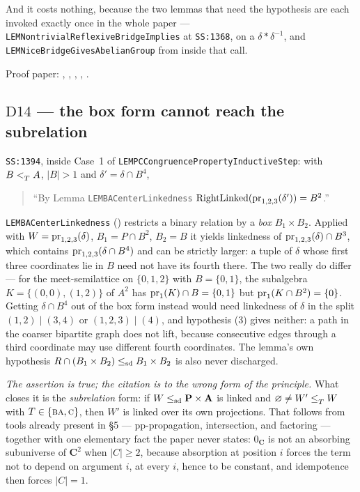 And it costs nothing, because the two lemmas that need the hypothesis are each
invoked exactly once in the whole paper --- \texttt{LEMNontrivialReflexive\-Bridge\-Implies}
at \texttt{SS:1368}, on a $\delta\ast\delta^{-1}$, and
\texttt{LEMNiceBridgeGivesAbelianGroup} from inside that call.

Proof paper: , ,
, ,
.

\subsection{$\mathrm D{14}$ --- the box form cannot reach the subrelation}
\label{sec:D14}

\texttt{SS:1394}, inside Case~1 of
\texttt{LEMPCCongruencePropertyInductiveStep}: with $B<_{T}^{}A$, $|B|>1$ and
$\delta'=\delta\cap B^{4}$,

\begin{quote}\small
``By Lemma \texttt{LEMBACenterLinkedness}
$\operatorname{RightLinked}(\operatorname*{pr}_{1,2,3}(\delta'))=B^{2}$.''
\end{quote}

\texttt{LEMBACenterLinkedness} (\cite[Prop.~2.15(i)]{BartoKozik}) restricts a
binary relation by a \emph{box} $B_{1}\times B_{2}$. Applied with
$W=\operatorname*{pr}_{1,2,3}(\delta)$, $B_{1}=P\cap B^{2}$, $B_{2}=B$ it yields linkedness
of $\operatorname*{pr}_{1,2,3}(\delta)\cap B^{3}$, which contains
$\operatorname*{pr}_{1,2,3}(\delta\cap B^{4})$ and can be strictly larger: a tuple of
$\delta$ whose first three coordinates lie in $B$ need not have its fourth
there. The two really do differ --- for the meet-semilattice on $\{0,1,2\}$
with $B=\{0,1\}$, the subalgebra $K=\{(0,0),(1,2)\}$ of $A^{2}$ has
$\operatorname*{pr}_{1}(K)\cap B=\{0,1\}$ but $\operatorname*{pr}_{1}(K\cap B^{2})=\{0\}$. Getting
$\delta\cap B^{4}$ out of the box form instead would need linkedness of
$\delta$ in the split $(1,2)\mid(3,4)$ or $(1,2,3)\mid(4)$, and hypothesis (3)
gives neither: a path in the coarser bipartite graph does not lift, because
consecutive edges through a third coordinate may use different fourth
coordinates. The lemma's own hypothesis $R\cap(B_{1}\times B_{2})\le_{\mathrm{sd}}
B_{1}\times B_{2}$ is also never discharged.

\emph{The assertion is true; the citation is to the wrong form of the
principle.} What closes it is the \emph{subrelation} form: if
$W\le_{\mathrm{sd}}\mathbf P\times\mathbf A$ is linked and $\varnothing\neq W'\le_{T}^{}W$
with $T\in\{\textup{\textsc{ba}},\textup{\textsc{c}}\}$, then $W'$ is linked over its own projections. That
follows from tools already present in \S5 --- pp-propagation, intersection, and
factoring --- together with one elementary fact the paper never states:
$0_{\mathbf C}$ is not an absorbing subuniverse of $\mathbf C^{2}$ when
$|C|\ge2$, because absorption at position $i$ forces the term not to depend on
argument $i$, at every $i$, hence to be constant, and idempotence then forces
$|C|=1$.

